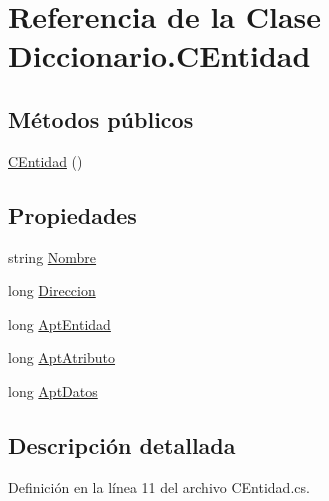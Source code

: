 \hypertarget{class_diccionario_1_1_c_entidad}{\section{Referencia de la Clase Diccionario.\-C\-Entidad}
\label{class_diccionario_1_1_c_entidad}
}
\subsection*{Métodos públicos}
\begin{DoxyCompactItemize}
\item 
\hyperlink{class_diccionario_1_1_c_entidad_a84373d4c6348472a5bf752b83ca0bf35}{C\-Entidad} ()
\end{DoxyCompactItemize}
\subsection*{Propiedades}
\begin{DoxyCompactItemize}
\item 
string \hyperlink{class_diccionario_1_1_c_entidad_a27e42bd3f037ebf4e4f0a96cc3798a6f}{Nombre}
\item 
long \hyperlink{class_diccionario_1_1_c_entidad_aed4d0c8b3d1727d6f2a27651951a629a}{Direccion}
\item 
long \hyperlink{class_diccionario_1_1_c_entidad_a813e698d00d5a66348242e55b003f3ab}{Apt\-Entidad}
\item 
long \hyperlink{class_diccionario_1_1_c_entidad_aa57f26ca608ad892af116373e777a364}{Apt\-Atributo}
\item 
long \hyperlink{class_diccionario_1_1_c_entidad_a148285b13120517575cac8b7b901cb8c}{Apt\-Datos}
\end{DoxyCompactItemize}


\subsection{Descripción detallada}


Definición en la línea 11 del archivo C\-Entidad.\-cs.



